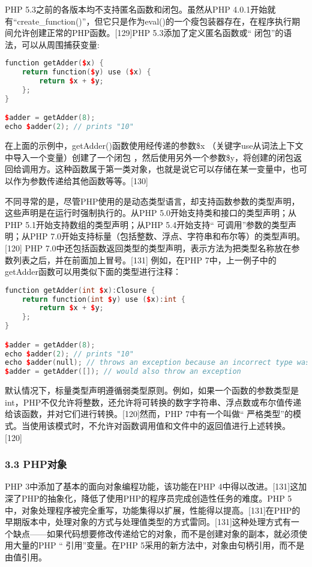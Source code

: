 PHP 5.3之前的各版本均不支持匿名函数和闭包。虽然从PHP 4.0.1开始就有“create_function()”，但它只是作为eval()的一个瘦包装器存在，在程序执行期间允许创建正常的PHP函数。[129]PHP 5.3添加了定义匿名函数或“ 闭包”的语法，可以从周围捕获变量:
\begin{lstlisting}[language=cpp]
function getAdder($x) {
    return function($y) use ($x) {
        return $x + $y;
    };
}

$adder = getAdder(8);
echo $adder(2); // prints "10"
\end{lstlisting}

在上面的示例中，getAdder()函数使用经传递的参数\$x （关键字use从词法上下文中导入一个变量）创建了一个闭包 ，然后使用另外一个参数\$y，将创建的闭包返回给调用方。这种函数属于第一类对象，也就是说它可以存储在某一变量中，也可以作为参数传递给其他函数等等。[130]

不同寻常的是，尽管PHP使用的是动态类型语言，却支持函数参数的类型声明，这些声明是在运行时强制执行的。从PHP 5.0开始支持类和接口的类型声明；从PHP 5.1开始支持数组的类型声明；从PHP 5.4开始支持“ 可调用”参数的类型声明；从PHP 7.0开始支持标量（包括整数、浮点、字符串和布尔等）的类型声明。[120] PHP 7.0中还包括函数返回类型的类型声明，表示方法为把类型名称放在参数列表之后，并在前面加上冒号。[131] 例如，在PHP 7中，上一例子中的getAdder函数可以用类似下面的类型进行注释：

\begin{lstlisting}[language=cpp]
function getAdder(int $x):Closure {
    return function(int $y) use ($x):int {
        return $x + $y;
    };
}

$adder = getAdder(8);
echo $adder(2); // prints "10"
echo $adder(null); // throws an exception because an incorrect type was passed
$adder = getAdder([]); // would also throw an exception
\end{lstlisting}
默认情况下，标量类型声明遵循弱类型原则。例如，如果一个函数的参数类型是int，PHP不仅允许将整数，还允许将可转换的数字字符串、浮点数或布尔值传递给该函数，并对它们进行转换。[120]然而，PHP 7中有一个叫做“ 严格类型”的模式。当使用该模式时，不允许对函数调用值和文件中的返回值进行上述转换。[120]

\subsubsection{3.3 PHP对象}
PHP 3中添加了基本的面向对象编程功能，该功能在PHP 4中得以改进。[131]这加深了PHP的抽象化，降低了使用PHP的程序员完成创造性任务的难度。PHP 5中，对象处理程序被完全重写，功能集得以扩展，性能得以提高。[131]在PHP的早期版本中，处理对象的方式与处理值类型的方式雷同。[131]这种处理方式有一个缺点——如果代码想要修改传递给它的对象，而不是创建对象的副本，就必须使用大量的PHP “ 引用”变量。在PHP 5采用的新方法中，对象由句柄引用，而不是由值引用。

